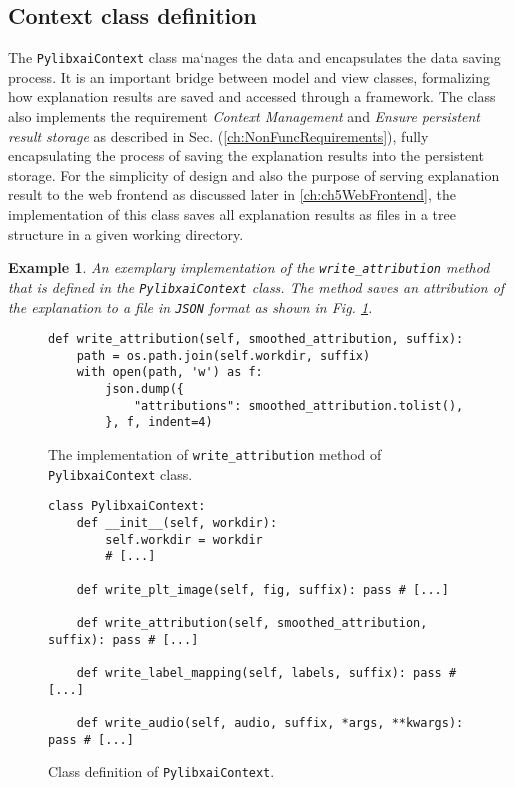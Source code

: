 \documentclass[
    bindingoffset=5mm,  %
    footnoteindent=3mm, %
    hyphenation=true    %
]{src/wut-thesis}
\newtheorem{example}{Example}
\begin{document}
\subsection{Context class definition}

The \texttt{PylibxaiContext} class ma`nages the data and encapsulates the data saving process.
It is an important bridge between model and view classes, formalizing how explanation results
are saved and accessed through a framework.
The class also implements the requirement \textit{Context Management}
and \textit{Ensure persistent result storage} as described
in Sec. (\ref{ch:NonFuncRequirements}), fully encapsulating the process of
saving the explanation results into the persistent storage. For the simplicity of design and also the purpose of serving
explanation result to the web frontend as discussed later in \ref{ch:ch5WebFrontend},
the implementation of this class saves all explanation results as files in a tree structure in a given working directory.

\begin{example}
    An exemplary implementation of the \texttt{write\_attribution} method that is defined in the
    \texttt{PylibxaiContext} class. The method saves an attribution of the explanation to a file in \texttt{JSON} format
    as shown in Fig. \ref{fig:WriteAttributionMethod}.
\end{example}

\begin{figure}%
\begin{verbatim}
def write_attribution(self, smoothed_attribution, suffix):
    path = os.path.join(self.workdir, suffix)
    with open(path, 'w') as f:
        json.dump({
            "attributions": smoothed_attribution.tolist(),
        }, f, indent=4)
\end{verbatim}
\caption{The implementation of \texttt{write\_attribution} method of \texttt{PylibxaiContext} class.}
\label{fig:WriteAttributionMethod}
\end{figure}

\begin{figure}%
\begin{verbatim}
class PylibxaiContext:
    def __init__(self, workdir):
        self.workdir = workdir
        # [...]
    
    def write_plt_image(self, fig, suffix): pass # [...]
    
    def write_attribution(self, smoothed_attribution, suffix): pass # [...]

    def write_label_mapping(self, labels, suffix): pass # [...]
    
    def write_audio(self, audio, suffix, *args, **kwargs): pass # [...]
\end{verbatim}
\caption{Class definition of \texttt{PylibxaiContext}.}
\label{fig:PylibxaiContext}
\end{figure}
\end{document}
